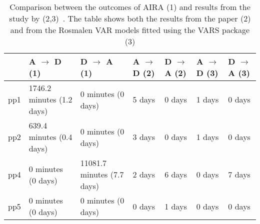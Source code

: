 \begin{table*}[ht]
\centering
\begin{tabular}{rllllll}
  \toprule
 & A $\rightarrow$ D (1) & D $\rightarrow$ A (1) & A $\rightarrow$ D (2) & D $\rightarrow$ A (2) & A $\rightarrow$ D (3) & D $\rightarrow$ A (3) \\ 
  \midrule
pp1 & 1746.2 minutes (1.2 days) & 0 minutes (0 days) & 5 days & 0 days & 1 days & 0 days \\ 
  pp2 & 639.4 minutes (0.4 days) & 0 minutes (0 days) & 3 days & 0 days & 1 days & 0 days \\ 
  pp4 & 0 minutes (0 days) & 11081.7 minutes (7.7 days) & 2 days & 6 days & 0 days & 7 days \\ 
  pp5 & 0 minutes (0 days) & 0 minutes (0 days) & 0 days & 1 days & 0 days & 0 days \\ 
   \bottomrule
\end{tabular}
\caption{Comparison between the outcomes of AIRA (1) and results from the study by \citeauthor{RefWorks:4} (2,3)~\cite{RefWorks:4}. The table shows both the results from the paper (2) and from the Rosmalen VAR models fitted using the VARS package (3)} 
\label{tab:comparison}
\end{table*}
